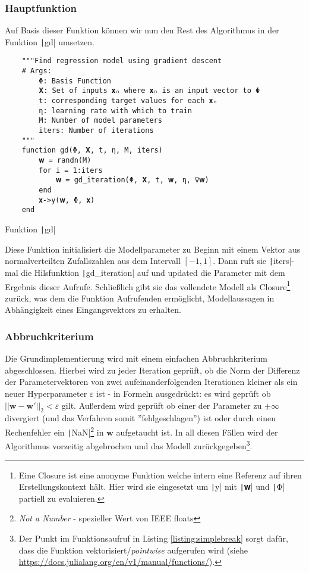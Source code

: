 \documentclass{article}
\theoremstyle{plain} %
\theoremstyle{definition} %
\begin{document}
\subsubsection{Hauptfunktion}

Auf Basis dieser Funktion können wir nun den Rest des Algorithmus in der Funktion \texttt|gd| umsetzen.

\begin{listing}[!ht]
  \begin{verbatim} 
    """Find regression model using gradient descent
    # Args:
        Φ: Basis Function
        𝐗: Set of inputs 𝐱ₙ where 𝐱ₙ is an input vector to Φ
        t: corresponding target values for each 𝐱ₙ
        η: learning rate with which to train
        M: Number of model parameters
        iters: Number of iterations
    """
    function gd(Φ, 𝐗, t, η, M, iters)
        𝐰 = randn(M)
        for i = 1:iters
            𝐰 = gd_iteration(Φ, 𝐗, t, 𝐰, η, ∇𝐰)
        end
        𝐱->y(𝐰, Φ, 𝐱)
    end
  \end{verbatim}
  \caption{Funktion \texttt|gd|}
  \label{listing:gd}
\end{listing}

Diese Funktion initialisiert die Modellparameter zu Beginn mit einem Vektor aus normalverteilten Zufallszahlen\cite{Lippe} aus dem Intervall $[-1, 1]$. Dann ruft sie \texttt|iters|-mal die Hilsfunktion \texttt|gd_iteration| auf und updated die Parameter mit dem Ergebnis dieser Aufrufe. Schließlich gibt sie das vollendete Modell als Closure\footnote{Eine Closure ist eine anonyme Funktion welche intern eine Referenz auf ihren Erstellungskontext hält. Hier wird sie eingesetzt um \texttt|y| mit \texttt|𝐰| und \texttt|Φ| partiell zu evaluieren.} zurück, was dem die Funktion Aufrufenden ermöglicht, Modellaussagen in Abhängigkeit eines Eingangsvektors zu erhalten.

\subsubsection{Abbruchkriterium}

Die Grundimplementierung wird mit einem einfachen Abbruchkriterium abgeschlossen. Hierbei wird zu jeder Iteration geprüft, ob die Norm der Differenz der Parametervektoren von zwei aufeinanderfolgenden Iterationen kleiner als ein neuer Hyperparameter $\varepsilon$ ist - in Formeln ausgedrückt: es wird geprüft ob $||\mathbf{w} - \mathbf{w}'||_2 < \varepsilon$ gilt.
Außerdem wird geprüft ob einer der Parameter zu $\pm\infty$ divergiert (und das Verfahren somit ''fehlgeschlagen'') ist oder durch einen Rechenfehler ein \texttt|NaN|\footnote{\emph{Not a Number} - spezieller Wert von IEEE floats} in $\mathbf{w}$ aufgetaucht ist. In all diesen Fällen wird der Algorithmus vorzeitig abgebrochen und das Modell zurückgegeben\footnote{Der Punkt im Funktionsaufruf in Listing \ref{listing:simplebreak} sorgt dafür, dass die Funktion vektorisiert/\emph{pointwise} aufgerufen wird (siehe \url{https://docs.julialang.org/en/v1/manual/functions/}).}.
\end{document}
